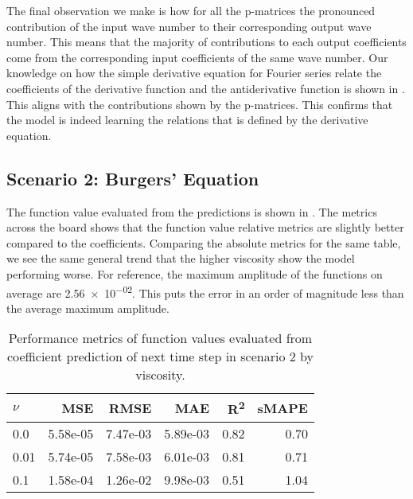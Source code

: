 \documentclass[preprint,12pt,times,authoryear]{elsarticle}
\begin{document}
The final observation we make is how for all the p-matrices the pronounced contribution of the input wave number to their corresponding output wave number. This means that the majority of contributions to each output coefficients come from the corresponding input coefficients of the same wave number. Our knowledge on how the simple derivative equation for Fourier series relate the coefficients of the derivative function and the antiderivative function is shown in . This aligns with the contributions shown by the p-matrices. This confirms that the model is indeed learning the relations that is defined by the derivative equation.

\subsection{Scenario 2: Burgers' Equation}
The function value evaluated from the predictions is shown in . The metrics across the board shows that the function value relative metrics are slightly better compared to the coefficients. Comparing the absolute metrics for the same table, we see the same general trend that the higher viscosity show the model performing worse. For reference, the maximum amplitude of the functions on average are \num{2.56e-02}. This puts the error in an order of magnitude less than the average maximum amplitude.
\begin{table}[H]
  \caption{Performance metrics of function values evaluated from coefficient prediction of next time step in scenario 2 by viscosity.}\label{table:scenario_2_function_metrics}
  \centering
  \begin{tabular}{lrrrrr}
    \toprule
    \(\nu \) & MSE      & RMSE     & MAE      & R\textsuperscript{2} & sMAPE \\
    \midrule
    0.0      & 5.58e-05 & 7.47e-03 & 5.89e-03 & 0.82                 & 0.70  \\
    0.01     & 5.74e-05 & 7.58e-03 & 6.01e-03 & 0.81                 & 0.71  \\
    0.1      & 1.58e-04 & 1.26e-02 & 9.98e-03 & 0.51                 & 1.04  \\
    \bottomrule
  \end{tabular}
\end{table}
\end{document}

